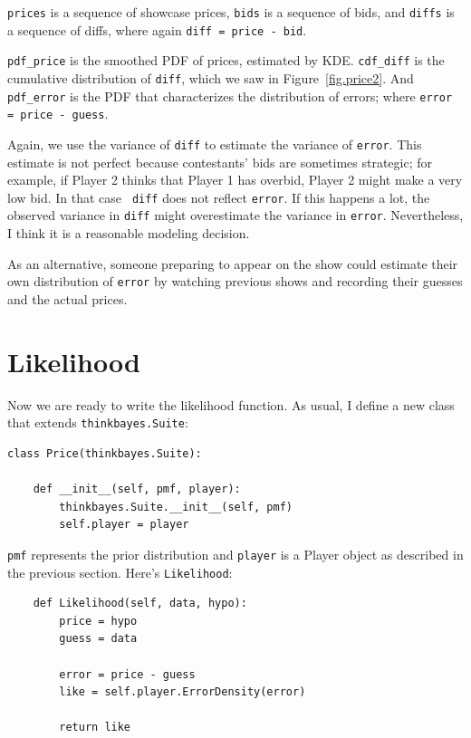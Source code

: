 \documentclass[12pt]{book}
\begin{document}
{\tt prices} is a sequence of showcase prices, {\tt bids} is a
sequence of bids, and {\tt diffs} is a sequence of diffs, where
again {\tt diff = price - bid}.

\verb"pdf_price" is the smoothed PDF of prices, estimated by KDE.
\verb"cdf_diff" is the cumulative distribution of {\tt diff},
which we saw in Figure~\ref{fig.price2}.  And \verb"pdf_error"
is the PDF that characterizes the distribution of errors; where
{\tt error = price - guess}.

Again, we use the variance of {\tt diff} to estimate the variance of
{\tt error}.  This estimate is not perfect because contestants' bids
are sometimes strategic; for example, if Player 2 thinks that Player 1
has overbid, Player 2 might make a very low bid.  In that case {\tt
  diff} does not reflect {\tt error}.  If this happens a lot, the
observed variance in {\tt diff} might overestimate the variance in
{\tt error}.  Nevertheless, I think it is a reasonable modeling
decision.

As an alternative, someone preparing to appear on the show could
estimate their own distribution of {\tt error} by watching previous shows
and recording their guesses and the actual prices.


\section{Likelihood}

Now we are ready to write the likelihood function.  As usual,
I define a new class that extends {\tt thinkbayes.Suite}:

\begin{verbatim}
class Price(thinkbayes.Suite):

    def __init__(self, pmf, player):
        thinkbayes.Suite.__init__(self, pmf)
        self.player = player
\end{verbatim}

{\tt pmf} represents the prior distribution and
{\tt player} is a Player object as described in the previous
section.  Here's {\tt Likelihood}:

\begin{verbatim}
    def Likelihood(self, data, hypo):
        price = hypo
        guess = data

        error = price - guess
        like = self.player.ErrorDensity(error)

        return like
\end{verbatim}
\end{document}
